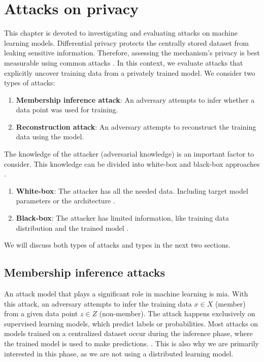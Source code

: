 \chapter{Attacks on privacy} \label{section: MIA}
This chapter is devoted to investigating and evaluating attacks on machine learning models.
Differential privacy protects the centrally stored dataset from leaking sensitive information.
Therefore, assessing the mechanism's privacy is best measurable using common attacks \citep{jayaraman_evaluating_nodate}.
In this context, we evaluate attacks that explicitly uncover training data from a privately trained model.
We consider two types of attacks:
\begin{enumerate}
  \item \textbf{Membership inference attack}: An adversary attempts to infer whether a data point was used for training.
  \item \textbf{Reconstruction attack}: An adversary attempts to reconstruct the training data using the model.
\end{enumerate}
The knowledge of the attacker (adversarial knowledge) is an important factor to consider.
This knowledge can be divided into white-box and black-box approaches \citep{hu_membership_2022}.
\begin{enumerate}
  \item \textbf{White-box}: The attacker has all the needed data. Including target model parameters or the architecture \citep{hu_membership_2022}.
  \item \textbf{Black-box}: The attacker has limited information, like training data distribution and the trained model \citep{hu_membership_2022}.
\end{enumerate}
We will discuss both types of attacks and types in the next two sections.

\section{Membership inference attacks}
An attack model that plays a significant role in machine learning is \gls{mia}.
With this attack, an adversary attempts to infer the training data $x \in X$ (member) from a given data point $z \in Z$ (non-member).
The attack happens exclusively on supervised learning models, which predict labels or probabilities.
Most attacks on models trained on a centralized dataset occur during the inference phase, where the trained model is used to make predictions. \citep{rigaki_survey_2021}.
This is also why we are primarily interested in this phase, as we are not using a distributed learning model.

